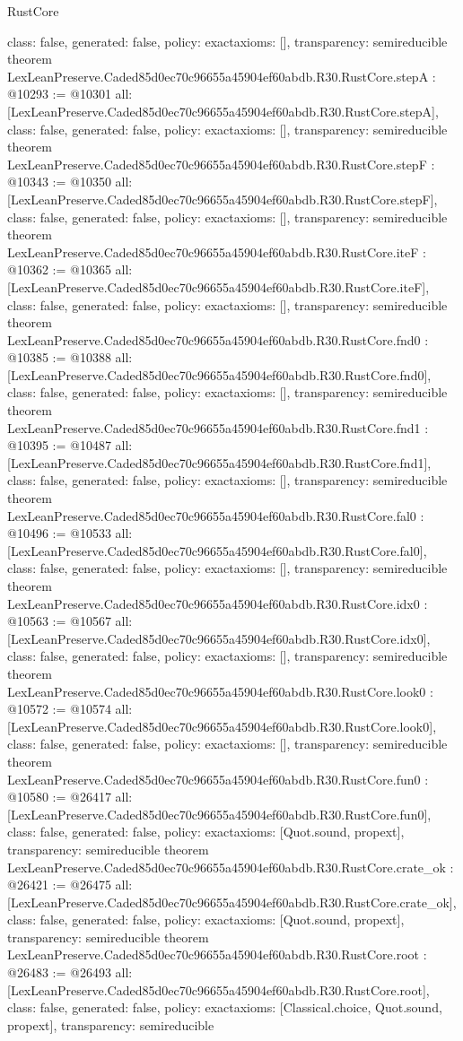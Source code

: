 \begin{lexlean}{RustCore}
\begin{coremodule}
{  class: false,
  generated: false,
  policy: exact{axioms: []},
  transparency: semireducible
}
theorem LexLeanPreserve.Caded85d0ec70c96655a45904ef60abdb.R30.RustCore.stepA : @10293 := @10301 {
  all: [LexLeanPreserve.Caded85d0ec70c96655a45904ef60abdb.R30.RustCore.stepA],
  class: false,
  generated: false,
  policy: exact{axioms: []},
  transparency: semireducible
}
theorem LexLeanPreserve.Caded85d0ec70c96655a45904ef60abdb.R30.RustCore.stepF : @10343 := @10350 {
  all: [LexLeanPreserve.Caded85d0ec70c96655a45904ef60abdb.R30.RustCore.stepF],
  class: false,
  generated: false,
  policy: exact{axioms: []},
  transparency: semireducible
}
theorem LexLeanPreserve.Caded85d0ec70c96655a45904ef60abdb.R30.RustCore.iteF : @10362 := @10365 {
  all: [LexLeanPreserve.Caded85d0ec70c96655a45904ef60abdb.R30.RustCore.iteF],
  class: false,
  generated: false,
  policy: exact{axioms: []},
  transparency: semireducible
}
theorem LexLeanPreserve.Caded85d0ec70c96655a45904ef60abdb.R30.RustCore.fnd0 : @10385 := @10388 {
  all: [LexLeanPreserve.Caded85d0ec70c96655a45904ef60abdb.R30.RustCore.fnd0],
  class: false,
  generated: false,
  policy: exact{axioms: []},
  transparency: semireducible
}
theorem LexLeanPreserve.Caded85d0ec70c96655a45904ef60abdb.R30.RustCore.fnd1 : @10395 := @10487 {
  all: [LexLeanPreserve.Caded85d0ec70c96655a45904ef60abdb.R30.RustCore.fnd1],
  class: false,
  generated: false,
  policy: exact{axioms: []},
  transparency: semireducible
}
theorem LexLeanPreserve.Caded85d0ec70c96655a45904ef60abdb.R30.RustCore.fal0 : @10496 := @10533 {
  all: [LexLeanPreserve.Caded85d0ec70c96655a45904ef60abdb.R30.RustCore.fal0],
  class: false,
  generated: false,
  policy: exact{axioms: []},
  transparency: semireducible
}
theorem LexLeanPreserve.Caded85d0ec70c96655a45904ef60abdb.R30.RustCore.idx0 : @10563 := @10567 {
  all: [LexLeanPreserve.Caded85d0ec70c96655a45904ef60abdb.R30.RustCore.idx0],
  class: false,
  generated: false,
  policy: exact{axioms: []},
  transparency: semireducible
}
theorem LexLeanPreserve.Caded85d0ec70c96655a45904ef60abdb.R30.RustCore.look0 : @10572 := @10574 {
  all: [LexLeanPreserve.Caded85d0ec70c96655a45904ef60abdb.R30.RustCore.look0],
  class: false,
  generated: false,
  policy: exact{axioms: []},
  transparency: semireducible
}
theorem LexLeanPreserve.Caded85d0ec70c96655a45904ef60abdb.R30.RustCore.fun0 : @10580 := @26417 {
  all: [LexLeanPreserve.Caded85d0ec70c96655a45904ef60abdb.R30.RustCore.fun0],
  class: false,
  generated: false,
  policy: exact{axioms: [Quot.sound, propext]},
  transparency: semireducible
}
theorem LexLeanPreserve.Caded85d0ec70c96655a45904ef60abdb.R30.RustCore.crate_ok : @26421 := @26475 {
  all: [LexLeanPreserve.Caded85d0ec70c96655a45904ef60abdb.R30.RustCore.crate_ok],
  class: false,
  generated: false,
  policy: exact{axioms: [Quot.sound, propext]},
  transparency: semireducible
}
theorem LexLeanPreserve.Caded85d0ec70c96655a45904ef60abdb.R30.RustCore.root : @26483 := @26493 {
  all: [LexLeanPreserve.Caded85d0ec70c96655a45904ef60abdb.R30.RustCore.root],
  class: false,
  generated: false,
  policy: exact{axioms: [Classical.choice, Quot.sound, propext]},
  transparency: semireducible
}


\end{coremodule}
\end{lexlean}

